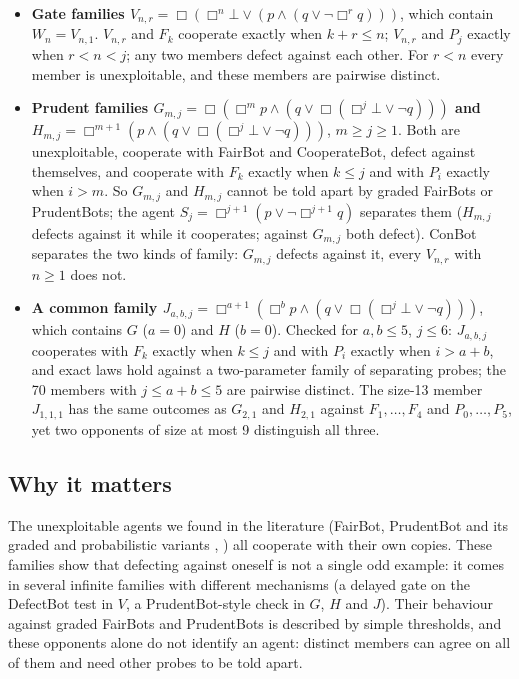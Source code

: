 \documentclass{article}
\begin{document}
\begin{itemize}
\item \textbf{Gate families $V_{n,r} = \Box(\Box^n\bot \vee (p \wedge (q \vee \neg\Box^r q)))$}, which contain $W_n = V_{n,1}$. $V_{n,r}$ and $F_k$ cooperate exactly when $k + r \le n$; $V_{n,r}$ and $P_j$ exactly when $r < n < j$; any two members defect against each other. For $r < n$ every member is unexploitable, and these members are pairwise distinct.
\item \textbf{Prudent families $G_{m,j} = \Box(\Box^m p \wedge (q \vee \Box(\Box^j\bot \vee \neg q)))$ and $H_{m,j} = \Box^{m+1}(p \wedge (q \vee \Box(\Box^j\bot \vee \neg q)))$}, $m \ge j \ge 1$. Both are unexploitable, cooperate with FairBot and CooperateBot, defect against themselves, and cooperate with $F_k$ exactly when $k \le j$ and with $P_i$ exactly when $i > m$. So $G_{m,j}$ and $H_{m,j}$ cannot be told apart by graded FairBots or PrudentBots; the agent $S_j = \Box^{j+1}(p \vee \neg\Box^{j+1} q)$ separates them ($H_{m,j}$ defects against it while it cooperates; against $G_{m,j}$ both defect). ConBot separates the two kinds of family: $G_{m,j}$ defects against it, every $V_{n,r}$ with $n \ge 1$ does not.
\item \textbf{A common family $J_{a,b,j} = \Box^{a+1}(\Box^b p \wedge (q \vee \Box(\Box^j\bot \vee \neg q)))$}, which contains $G$ ($a = 0$) and $H$ ($b = 0$). Checked for $a, b \le 5$, $j \le 6$: $J_{a,b,j}$ cooperates with $F_k$ exactly when $k \le j$ and with $P_i$ exactly when $i > a + b$, and exact laws hold against a two-parameter family of separating probes; the 70 members with $j \le a + b \le 5$ are pairwise distinct. The size-13 member $J_{1,1,1}$ has the same outcomes as $G_{2,1}$ and $H_{2,1}$ against $F_1, \dots, F_4$ and $P_0, \dots, P_5$, yet two opponents of size at most 9 distinguish all three.
\end{itemize}

\subsection*{Why it matters}

The unexploitable agents we found in the literature (FairBot, PrudentBot and its graded and
probabilistic variants \cite{barasz2014robust}, \cite{oesterheld2022compatibility}) all cooperate with
their own copies. These families show that defecting against oneself is not a single odd
example: it comes in several infinite families with different mechanisms (a delayed gate on
the DefectBot test in $V$, a PrudentBot-style check in $G$, $H$ and $J$). Their behaviour
against graded FairBots and PrudentBots is described by simple thresholds, and these opponents
alone do not identify an agent: distinct members can agree on all of them and need other probes
to be told apart.
\end{document}
